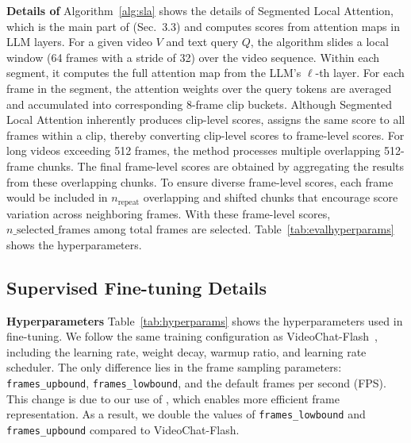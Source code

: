 \noindent\textbf{Details of \segment}\;\; Algorithm~\ref{alg:sla} shows the details of Segmented Local Attention, which is the main part of \segment(Sec.~\textcolor{iccvblue}{3.3}) and computes scores from attention maps in LLM layers. For a given video $V$ and text query $Q$, the algorithm slides a local window (64 frames with a stride of 32) over the video sequence. Within each segment, it computes the full attention map from the LLM’s $\ell$-th layer. For each frame in the segment, the attention weights over the query tokens are averaged and accumulated into corresponding 8-frame clip buckets. Although Segmented Local Attention inherently produces clip-level scores, \segment assigns the same score to all frames within a clip, thereby converting clip-level scores to frame-level scores. For long videos exceeding 512 frames, the method processes multiple overlapping 512-frame chunks. The final frame-level scores are obtained by aggregating the results from these overlapping chunks. To ensure diverse frame-level scores, each frame would be included in $n_{\mathrm{repeat}}$ overlapping and shifted chunks that encourage score variation across neighboring frames. With these frame-level scores, $n\_\mathrm{selected\_frames}$ among total frames are selected. Table~\ref{tab:evalhyperparams} shows the hyperparameters.

\subsection{Supervised Fine-tuning Details} \label{app: sft}

\noindent\textbf{Hyperparameters}\;\; Table~\ref{tab:hyperparams} shows the hyperparameters used in fine-tuning. We follow the same training configuration as VideoChat-Flash~\cite{li2024videochat}, including the learning rate, weight decay, warmup ratio, and learning rate scheduler. The only difference lies in the frame sampling parameters: \texttt{frames\_upbound}, \texttt{frames\_lowbound}, and the default frames per second (FPS). This change is due to our use of \drop, which enables more efficient frame representation. As a result, we double the values of \texttt{frames\_lowbound} and \texttt{frames\_upbound} compared to VideoChat-Flash.


